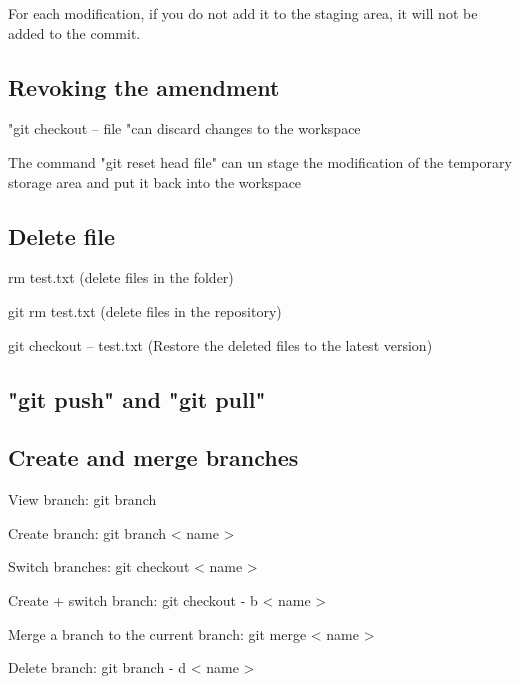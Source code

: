 For each modification, if you do not add it to the staging area, it will not be added to the commit.
\subsection{Revoking the amendment}
"git checkout -- file "can discard changes to the workspace

The command "git reset head file" can un stage the modification of the temporary storage area and put it back into the workspace
\subsection{Delete file}
rm test.txt (delete files in the folder)

git rm test.txt (delete files in the repository)

git checkout -- test.txt (Restore the deleted files to the latest version)
\subsection{"git push" and "git pull"}
\subsection{Create and merge branches}
View branch: git branch

Create branch: git branch < name > 

Switch branches: git checkout < name > 

Create + switch branch: git checkout - b < name >

Merge a branch to the current branch: git merge < name > 

Delete branch: git branch - d < name > 


